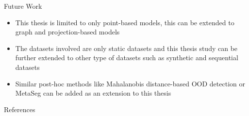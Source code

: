 \documentclass[aspectratio=169]{beamer}
\begin{document}
\begin{frame}{Future Work}
    \begin{itemize}
        \item This thesis is limited to only point-based models, this can be extended to graph and projection-based models
        \item The datasets involved are only static datasets and this thesis study can be further extended to other type of datasets such as synthetic and sequential datasets
        \item Similar post-hoc methods like Mahalanobis distance-based OOD detection \cite{lee2018simple_mahalanobis} or MetaSeg \cite{MetaSeg} can be added as an extension to this thesis
    \end{itemize}
\end{frame}

\begin{frame}{References}
    
    

\end{frame}
\end{document}
